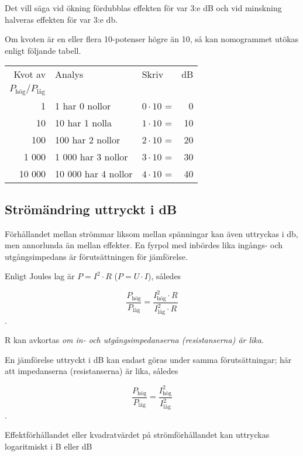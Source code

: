 Det vill säga vid ökning fördubblas effekten för var 3:e dB och vid minskning
halveras effekten för var 3:e \si{\decibel}.

Om kvoten är en eller flera 10-potenser högre än 10, så kan nomogrammet utökas
enligt följande tabell.

\begin{center}
\begin{tabular}{rllr}
Kvot av & Analys             & Skriv            & dB \\
\(P_{\text{hög}}/P_{\text{låg}}\) &          &                  &    \\
     1 & 1 har 0 nollor      & \(0 \cdot 10\) = &  0 \\
    10 & 10 har 1 nolla      & \(1 \cdot 10\) = & 10 \\
   100 & 100 har 2 nollor    & \(2 \cdot 10\) = & 20 \\
 1 000 &  1 000 har 3 nollor & \(3 \cdot 10\) = & 30 \\
10 000 & 10 000 har 4 nollor & \(4 \cdot 10\) = & 40
\end{tabular}
\end{center}

\subsection{Strömändring uttryckt i dB}

Förhållandet mellan strömmar liksom mellan spänningar kan även uttryckas i
\si{\decibel}, men annorlunda än mellan effekter.
En fyrpol med inbördes lika ingångs- och utgångsimpedans är förutsättningen för
jämförelse.

Enligt Joules lag är \(P = I^2 \cdot R\) (\(P = U \cdot I\)), således

\[\dfrac{P_\text{hög}}{P_\text{l{\aa}g}} = \dfrac{I_\text{hög}^2 \cdot R}{I_\text{l{\aa}g}^2 \cdot R}\].

R kan avkortas \emph{om in- och utgångsimpedanserna (resistanserna) är lika}.

En jämförelse uttryckt i dB kan endast göras under samma förutsättningar;
här att impedanserna (resistanserna) är lika, således

\[\dfrac{P_\text{hög}}{P_\text{låg}} = \dfrac{I_\text{hög}^2}{I_\text{låg}^2}\].

Effektförhållandet eller kvadratvärdet på strömförhållandet kan uttryckas
logaritmiskt i B eller dB

